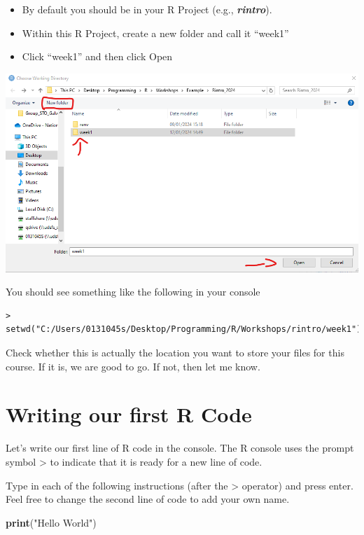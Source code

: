 \documentclass[
]{book}
\newenvironment{Shaded}{\begin{snugshade}}{\end{snugshade}}
\newcommand{\FunctionTok}[1]{\textcolor[rgb]{0.13,0.29,0.53}{\textbf{#1}}}
\newcommand{\NormalTok}[1]{#1}
\newcommand{\StringTok}[1]{\textcolor[rgb]{0.31,0.60,0.02}{#1}}
\begin{document}
\begin{itemize}
\item
  By default you should be in your R Project (e.g., \textbf{\emph{rintro}}).
\item
  Within this R Project, create a new folder and call it ``week1''
\item
  Click ``week1'' and then click Open
\end{itemize}

\includegraphics{img/01-new_wd.png}

You should see something like the following in your console

\begin{verbatim}
> setwd("C:/Users/0131045s/Desktop/Programming/R/Workshops/rintro/week1")
\end{verbatim}

Check whether this is actually the location you want to store your files for this course. If it is, we are good to go. If not, then let me know.

\hypertarget{writing-our-first-r-code}{%
\section{Writing our first R Code}\label{writing-our-first-r-code}}

Let's write our first line of R code in the console. The R console uses the prompt symbol \textgreater{} to indicate that it is ready for a new line of code.

Type in each of the following instructions (after the \textgreater{} operator) and press enter. Feel free to change the second line of code to add your own name.

\begin{Shaded}
\begin{Highlighting}[]
\FunctionTok{print}\NormalTok{(}\StringTok{"Hello World"}\NormalTok{)}
\end{Highlighting}
\end{Shaded}
\end{document}
